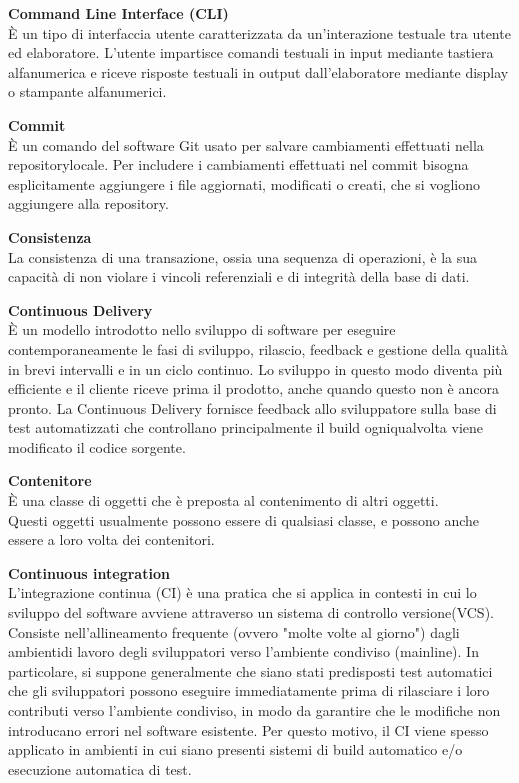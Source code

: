 \documentclass[a4paper, oneside, openany, dvipsnames, table, 12pt]{article}
\begin{document}
\textbf{Command Line Interface (CLI)} \\
È un tipo di interfaccia utente caratterizzata da un'interazione testuale tra utente ed elaboratore. L'utente impartisce comandi testuali in input mediante tastiera alfanumerica e riceve risposte testuali in output dall'elaboratore mediante display o stampante alfanumerici. 

\textbf{Commit} \\
È un comando del software Git usato per salvare cambiamenti effettuati nella repository\glo locale. Per includere i cambiamenti effettuati nel commit bisogna esplicitamente aggiungere i file aggiornati, modificati o creati, che si vogliono aggiungere alla repository.

\textbf{Consistenza} \\
La consistenza di una transazione, ossia una sequenza di operazioni, è la sua capacità di non violare i vincoli referenziali e di integrità della base di dati.

\textbf{Continuous Delivery} \\
È un modello introdotto nello sviluppo di software per eseguire contemporaneamente le fasi di sviluppo, rilascio, feedback e gestione della qualità in brevi intervalli e in un ciclo continuo. Lo sviluppo in questo modo diventa più efficiente e il cliente riceve prima il prodotto, anche quando questo non è ancora pronto. La Continuous Delivery fornisce feedback allo sviluppatore sulla base di test automatizzati che controllano principalmente il build ogniqualvolta viene modificato il codice sorgente.

\label{par:container}
\textbf{Contenitore} \\
È una classe di oggetti che è preposta al contenimento di altri oggetti. \\ 
Questi oggetti usualmente possono essere di qualsiasi classe, e possono anche essere a loro volta dei contenitori.

\textbf{Continuous integration} \\
L'integrazione continua (CI) è una pratica che si applica in contesti in cui lo sviluppo del software avviene attraverso un sistema di controllo versione\glo (VCS\glo). Consiste nell'allineamento frequente (ovvero "molte volte al giorno") dagli ambienti\glo di lavoro degli sviluppatori verso l'ambiente condiviso (mainline).
In particolare, si suppone generalmente che siano stati predisposti test automatici che gli sviluppatori possono eseguire immediatamente prima di rilasciare i loro contributi verso l'ambiente condiviso, in modo da garantire che le modifiche non introducano errori nel software esistente. Per questo motivo, il CI viene spesso applicato in ambienti in cui siano presenti sistemi di build automatico e/o esecuzione automatica di test.
\end{document}
